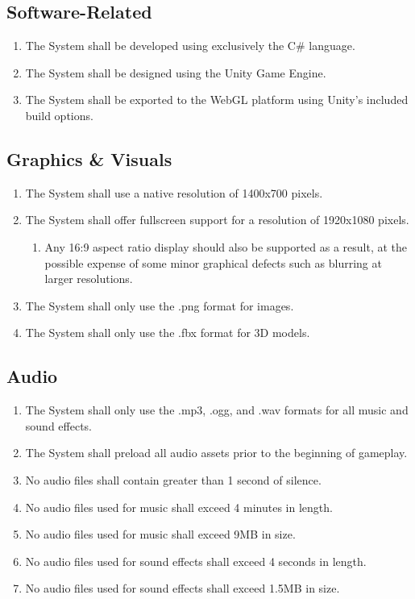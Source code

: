 \documentclass[12pt]{report}
\newenvironment{reqlist}{
	\renewcommand{\labelenumi}{\tab\thesubsection.\arabic{enumi}}
	\renewcommand{\labelenumii}{\thesubsection.\arabic{enumi}.\arabic{enumii}}
	\begin{enumerate}[itemsep = 1pt, parsep = 0pt, leftmargin = *]
}{\end{enumerate}}
\begin{document}
	\subsection{Software-Related}
		\begin{reqlist}
			\item The System shall be developed using exclusively the C\# language.
			\item The System shall be designed using the Unity Game Engine.
			\item The System shall be exported to the WebGL platform using Unity's included build options.
		\end{reqlist}
	\subsection{Graphics \& Visuals}
		\begin{reqlist}
			\item The System shall use a native resolution of 1400x700 pixels.
			\item The System shall offer fullscreen support for a resolution of 1920x1080 pixels.
			\begin{reqlist}
				\item Any 16:9 aspect ratio display should also be supported as a result, at the possible expense of some minor graphical defects such as blurring at larger resolutions.
			\end{reqlist}
			\item The System shall only use the .png format for images.
			\item The System shall only use the .fbx format for 3D models.
		\end{reqlist}
	\subsection{Audio}
		\begin{reqlist}
			\item The System shall only use the .mp3, .ogg, and .wav formats for all music and sound effects.
			\item The System shall preload all audio assets prior to the beginning of gameplay.
			\item No audio files shall contain greater than 1 second of silence.
			\item No audio files used for music shall exceed 4 minutes in length.
			\item No audio files used for music shall exceed 9MB in size.
			\item No audio files used for sound effects shall exceed 4 seconds in length.
			\item No audio files used for sound effects shall exceed 1.5MB in size.
		\end{reqlist}
\end{document}
